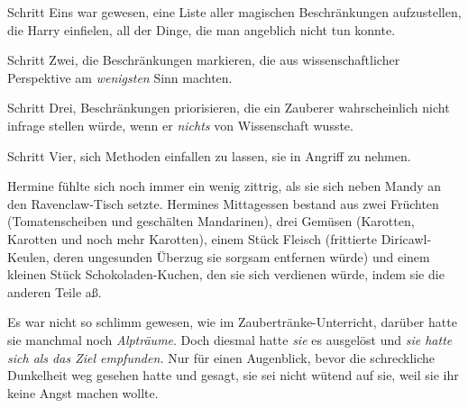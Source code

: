 Schritt Eins war gewesen, eine Liste aller magischen Beschränkungen aufzustellen, die Harry einfielen, all der Dinge, die man angeblich nicht tun konnte.

Schritt Zwei, die Beschränkungen markieren, die aus wissenschaftlicher Perspektive am \emph{wenigsten} Sinn machten.

Schritt Drei, Beschränkungen priorisieren, die ein Zauberer wahrscheinlich nicht infrage stellen würde, wenn er \emph{nichts} von Wissenschaft wusste.

Schritt Vier, sich Methoden einfallen zu lassen, sie in Angriff zu nehmen.

\later

Hermine fühlte sich noch immer ein wenig zittrig, als sie sich neben Mandy an den Ravenclaw-Tisch setzte. Hermines Mittagessen bestand aus zwei Früchten (Tomatenscheiben und geschälten Mandarinen), drei Gemüsen (Karotten, Karotten und noch mehr Karotten), einem Stück Fleisch (frittierte Diricawl-Keulen, deren ungesunden Überzug sie sorgsam entfernen würde) und einem kleinen Stück Schokoladen-Kuchen, den sie sich verdienen würde, indem sie die anderen Teile aß.

Es war nicht so schlimm gewesen, wie im Zaubertränke-Unterricht, darüber hatte sie manchmal noch \emph{Alpträume}. Doch diesmal hatte \emph{sie} es ausgelöst und \emph{sie hatte sich als das Ziel empfunden.} Nur für einen Augenblick, bevor die schreckliche Dunkelheit weg gesehen hatte und gesagt, sie sei nicht wütend auf sie, weil sie ihr keine Angst machen wollte.


